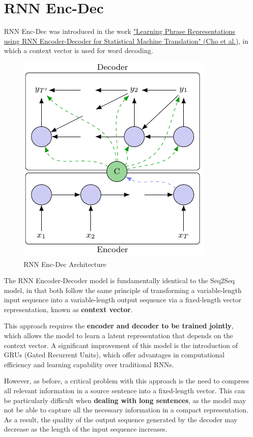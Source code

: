 \section{RNN Enc-Dec}
RNN Enc-Dec was introduced in the work \href{https://arxiv.org/pdf/1409.3215}{"Learning Phrase Representations using RNN Encoder-Decoder for Statistical Machine Translation" (Cho et al.)}, in which a context vector is used for word decoding.

\begin{figure}[!htbp]
    \centering
    \includegraphics[width=0.7\linewidth]{tikz/chapter7 - RNN Enc-Dec.pdf}
    \caption{RNN Enc-Dec Architecture}
\end{figure}

The RNN Encoder-Decoder model is fundamentally identical to the Seq2Seq model, in that both follow the same principle of transforming a variable-length input sequence into a variable-length output sequence via a fixed-length vector representation, known as \textbf{\textcolor{mygreen}{context vector}}. 

This approach requires the \textbf{encoder and decoder to be trained jointly}, which allows the model to learn a latent representation that depends on the context vector. A significant improvement of this model is the introduction of GRUs (Gated Recurrent Units), which offer advantages in computational efficiency and learning capability over traditional RNNs.

However, as before, a critical problem with this approach is the need to compress all relevant information in a source sentence into a fixed-length vector. This can be particularly difficult when \textbf{dealing with long sentences}, as the model may not be able to capture all the necessary information in a compact representation. As a result, the quality of the output sequence generated by the decoder may decrease as the length of the input sequence increases.

